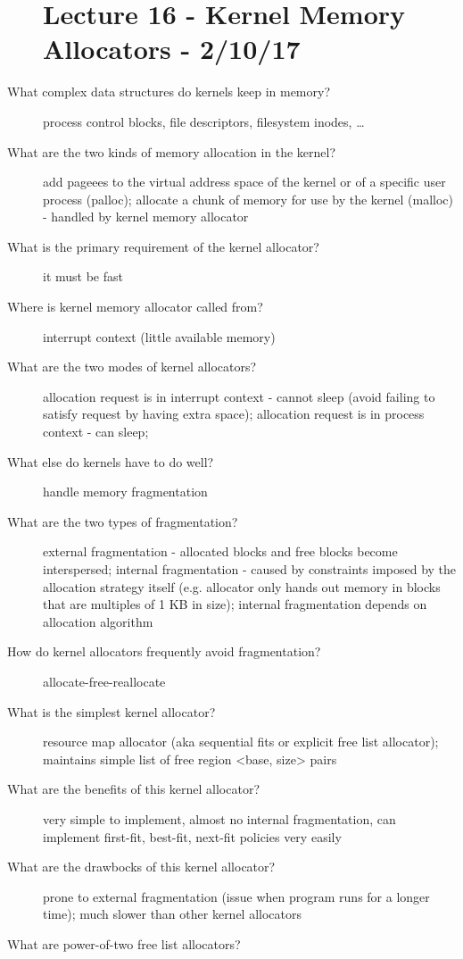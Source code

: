 \documentclass[10pt]{article}
\begin{document}
\begin{description}
\section{Lecture 16 - Kernel Memory Allocators - 2/10/17}
\item[What complex data structures do kernels keep in memory?]
  process control blocks, file descriptors, filesystem inodes, \dots
\item[What are the two kinds of memory allocation in the kernel?]
  add pageees to the virtual address space of the kernel or of a specific user process (palloc);
  allocate a chunk of memory for use by the kernel (malloc) - handled by kernel memory allocator
\item[What is the primary requirement of the kernel allocator?]
  it must be fast
\item[Where is kernel memory allocator called from?]
  interrupt context (little available memory)
\item[What are the two modes of kernel allocators?]
  allocation request is in interrupt context - cannot sleep (avoid failing to satisfy request by having extra space);
  allocation request is in process context - can sleep;
\item[What else do kernels have to do well?]
  handle memory fragmentation
\item[What are the two types of fragmentation?]
  external fragmentation - allocated blocks and free blocks become interspersed;
  internal fragmentation - caused by constraints imposed by the allocation strategy itself (e.g. allocator only hands out memory in blocks that are multiples of 1 KB in size);
  internal fragmentation depends on allocation algorithm
\item[How do kernel allocators frequently avoid fragmentation?]
  allocate-free-reallocate
\item[What is the simplest kernel allocator?]
  resource map allocator (aka sequential fits or explicit free list allocator);
  maintains simple list of free region <base, size> pairs
\item[What are the benefits of this kernel allocator?]
  very simple to implement, almost no internal fragmentation, can implement first-fit, best-fit, next-fit policies very easily
\item[What are the drawbocks of this kernel allocator?]
  prone to external fragmentation (issue when program runs for a longer time);
  much slower than other kernel allocators
\item[What are power-of-two free list allocators?]

\end{description}
\end{document}
